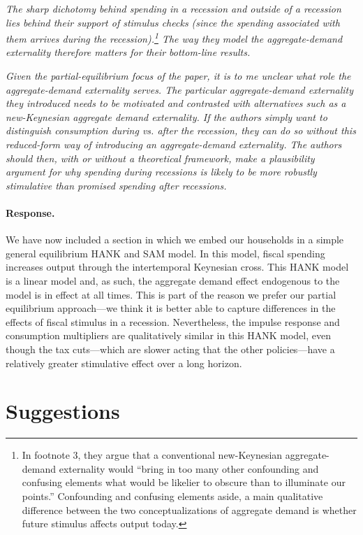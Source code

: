 \documentclass[12pt,letterpaper,english]{article}
\begin{document}
\begin{enumerate}
	\textit{The sharp dichotomy behind spending in a recession and outside of a recession lies behind their support of stimulus checks (since the spending	associated with them arrives during the recession).\footnote{In footnote 3, they argue that a conventional new-Keynesian aggregate-demand externality would ``bring in too many other confounding and confusing elements what would be likelier to obscure than to illuminate our points.'' Confounding and confusing elements aside, a main qualitative difference between the two conceptualizations of aggregate demand is whether future stimulus affects output today.} The way they model the aggregate-demand externality therefore matters for their bottom-line results.}
	
	\textit{Given the partial-equilibrium focus of the paper, it is to me unclear what role the aggregate-demand externality serves. The particular	aggregate-demand externality they introduced needs to be motivated and contrasted with alternatives such as a new-Keynesian aggregate demand externality. If the authors simply want to distinguish consumption	during vs. after the recession, they can do so without this	reduced-form way of introducing an aggregate-demand externality. The	authors should then, with or without a theoretical framework, make a plausibility argument for why spending during recessions is likely to be more robustly stimulative than promised spending after recessions.}
	
	\paragraph{Response.} We have now included a section in which we embed our households in a simple general equilibrium HANK and SAM model. In this model, fiscal spending increases output through the intertemporal Keynesian cross. This HANK model is a linear model and, as such, the aggregate demand effect endogenous to the model is in effect at all times. This is part of the reason we prefer our partial equilibrium approach---we think it is better able to capture differences in the effects of fiscal stimulus in a recession. Nevertheless, the impulse response and consumption multipliers are qualitatively similar in this HANK model, even though the tax cuts---which are slower acting that the other policies---have a relatively greater stimulative effect over a long horizon.

\end{enumerate}

\section{Suggestions}
\end{document}

